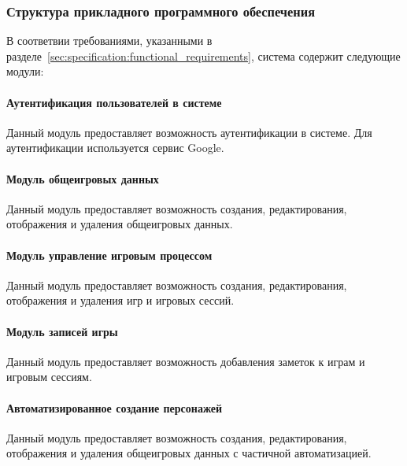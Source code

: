 \subsubsection{Структура прикладного программного обеспечения}

В соответвии требованиями, указанными в разделе~\ref{sec:specification:functional_requirements}, система содержит следующие модули:
\paragraph{Аутентификация пользователей в системе}

Данный модуль предоставляет возможность аутентификации в системе. Для аутентификации используется сервис Google.

\paragraph{Модуль общеигровых данных}

Данный модуль предоставляет возможность создания, редактирования, отображения и удаления общеигровых данных.

\paragraph{Модуль управление игровым процессом}

Данный модуль предоставляет возможность создания, редактирования, отображения и удаления игр и игровых сессий.

\paragraph{Модуль записей игры}

Данный модуль предоставляет возможность добавления заметок к играм и игровым сессиям.

\paragraph{Автоматизированное создание персонажей}

Данный модуль предоставляет возможность создания, редактирования, отображения и удаления общеигровых данных с частичной автоматизацией.
